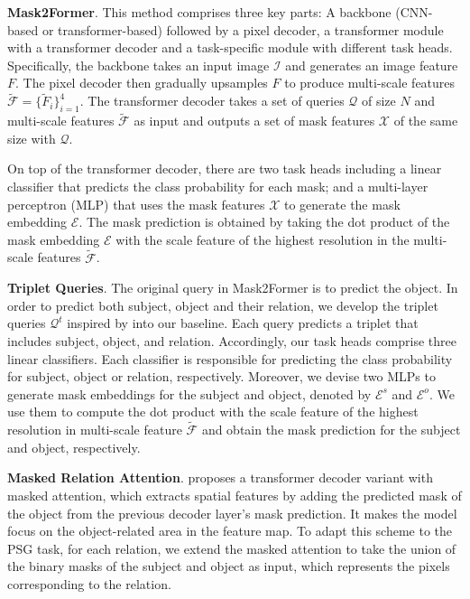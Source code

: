 \noindent \textbf{Mask2Former}.
This method comprises three key parts: A backbone (CNN-based or transformer-based) followed by a pixel decoder, a transformer module with a transformer decoder and a task-specific module with different task heads. 
Specifically, the backbone takes an input image $\mathcal I$ and generates an image feature $F$.
The pixel decoder then gradually upsamples $F$ to produce multi-scale features $\mathcal{\widetilde F} = \{\widetilde F_i\}_{i=1}^4$.
The transformer decoder takes a set of queries $\mathcal {Q}$ of size $N$ and multi-scale features $\mathcal{\widetilde F}$ as input and outputs a set of mask features $\mathcal X$ of the same size with $\mathcal{Q}$.

On top of the transformer decoder, there are two task heads including a linear classifier that predicts the class probability for each mask; and a multi-layer perceptron (MLP) that uses the mask features $\mathcal X$ to  generate the mask embedding $\mathcal{E}$.
The mask prediction is obtained by taking the dot product of the mask embedding $\mathcal{E}$ with the scale feature of the highest resolution in the multi-scale features $\mathcal{\widetilde F}$.

\noindent \textbf{Triplet Queries}.
The original query in Mask2Former is to predict the object. In order to predict both subject, object and their relation, we develop the triplet queries $\mathcal{Q}^{t}$ inspired by \citep{yang2022panoptic} into our baseline.
Each query predicts a triplet that includes subject, object, and relation.
Accordingly, our task heads comprise three linear classifiers. Each classifier is responsible for predicting the class probability for subject, object or relation, respectively. 
Moreover, we devise two MLPs to generate mask embeddings for the subject and object, denoted by $\mathcal{E}^s$ and $\mathcal{E}^o$. We use them to compute the dot product with the scale feature of the highest resolution in multi-scale feature $\mathcal{\widetilde F}$ and obtain the mask prediction for the subject and object, respectively.

\noindent \textbf{Masked Relation Attention}.
\citep{cheng2022masked} proposes a transformer decoder variant with masked attention, which extracts spatial features by adding the predicted mask of the object from the previous decoder layer's mask prediction.
It makes the model focus on the object-related area in the feature map.
To adapt this scheme to the PSG task, for each relation, we extend the masked attention to take the union of the binary masks of the subject and object as input, which represents the pixels corresponding to the relation.

